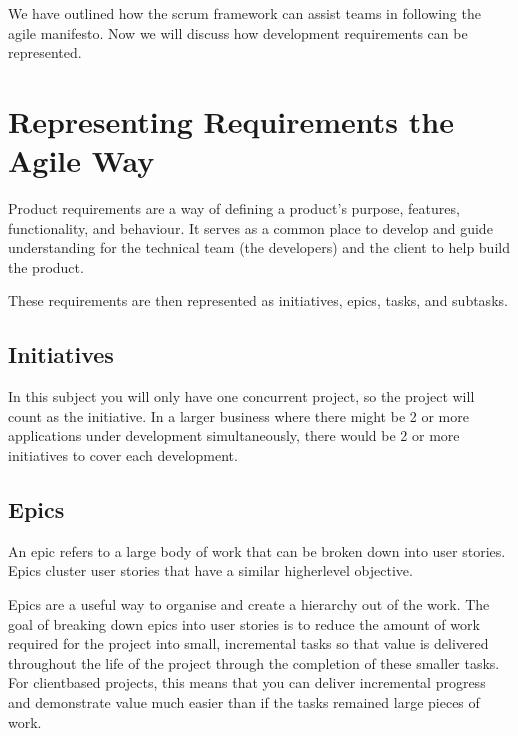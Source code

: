 \documentclass[letterpaper,10pt,english]{jupyterBook}
\begin{document}
\sphinxAtStartPar
We have outlined how the scrum framework can assist teams in following
the agile manifesto. Now we will discuss how development requirements
can be represented.


\section{Representing Requirements the Agile Way}
\label{\detokenize{chapter_1/agile_methodology:representing-requirements-the-agile-way}}
\sphinxAtStartPar
Product requirements are a way of defining a product’s purpose,
features, functionality, and behaviour. It serves as a common place to
develop and guide understanding for the technical team (the developers)
and the client to help build the product.

\sphinxAtStartPar
These requirements are then represented as initiatives, epics, tasks,
and subtasks.

\sphinxAtStartPar
{}

\sphinxAtStartPar
{} 


\subsection{Initiatives}
\label{\detokenize{chapter_1/agile_methodology:initiatives}}
\sphinxAtStartPar
In this subject you will only have one concurrent project, so the
project will count as the initiative. In a larger business where there
might be 2 or more applications under development simultaneously, there
would be 2 or more initiatives to cover each development.


\subsection{Epics}
\label{\detokenize{chapter_1/agile_methodology:epics}}
\sphinxAtStartPar
An epic refers to a large body of work that can be broken down into user
stories. Epics cluster user stories that have a similar higher\sphinxhyphen{}level
objective.

\sphinxAtStartPar
Epics are a useful way to organise and create a hierarchy out of the
work. The goal of breaking down epics into user stories is to reduce the
amount of work required for the project into small, incremental tasks so
that value is delivered throughout the life of the project through the
completion of these smaller tasks. For client\sphinxhyphen{}based projects, this means
that you can deliver incremental progress and demonstrate value much
easier than if the tasks remained large pieces of work.
\end{document}
